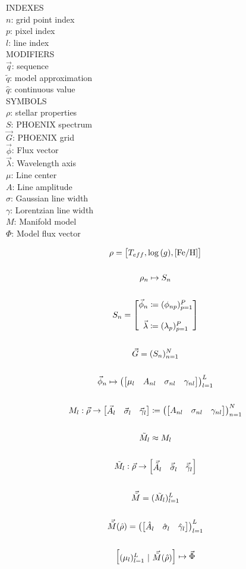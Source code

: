 \documentclass{article}
\begin{document}
\centering
INDEXES\\
$n$: grid point index\\
$p$: pixel index\\
$l$: line index\\

MODIFIERS\\
$\vec{q}$: sequence\\
$\tilde{q}$: model approximation\\
$\hat{q}$: continuous value\\

SYMBOLS\\
$\rho$: stellar properties\\
$S$: PHOENIX spectrum\\
$\vec{G}$: PHOENIX grid\\
$\vec{\phi}$: Flux vector\\
$\vec{\lambda}$: Wavelength axis\\
$\mu$: Line center\\
$A$: Line amplitude\\
$\sigma$: Gaussian line width\\
$\gamma$: Lorentzian line width\\
$M$: Manifold model\\
$\Phi$: Model flux vector

\begin{gather*}
\rho = \mqty[T_{eff}, \log{(g)}, [\text{Fe/H}]] \\\\
\rho_n \mapsto S_n \\\\
S_n = \mqty[\vec{\phi}_n \coloneqq (\phi_{np})_{p=1}^P \\\\ \vec{\lambda} \coloneqq (\lambda_{p})_{p=1}^P] \\\\
\vec{G} = (S_n)_{n=1}^N \\\\
\vec{\phi}_n \mapsto \left(\mqty[\mu_{l} & A_{nl} & \sigma_{nl} & \gamma_{nl}]\right)_{l=1}^L \\\\
M_{l}: \vec{\rho} \to \mqty[\vec{A}_l & \vec{\sigma}_l & \vec{\gamma}_l] \coloneqq \left(\mqty[A_{nl} & \sigma_{nl} & \gamma_{nl}]\right)_{n=1}^N \\\\
\tilde{M}_l \approx M_l \\\\
\tilde{M}_l: \vec{\rho} \to \mqty[\vec{\tilde{A}}_l & \vec{\tilde{\sigma}}_l & \vec{\tilde{\gamma}}_l] \\\\
\vec{\tilde{M}} = (\tilde{M_l})_{l=1}^L \\\\
\vec{\tilde{M}}(\hat{\rho}) = \left(\mqty[\hat{A}_l & \hat{\sigma}_l & \hat{\gamma}_l]\right)_{l=1}^L \\\\
\mqty[(\mu_l)_{l=1}^L ~|~ \vec{\tilde{M}}(\hat{\rho})] \mapsto \vec{\Phi}
\end{gather*}
\end{document}
